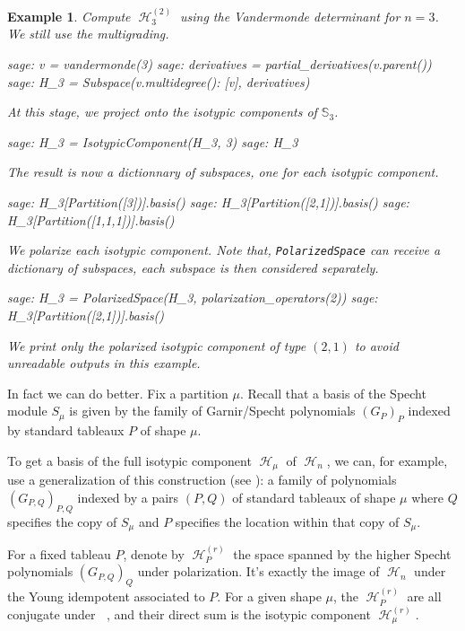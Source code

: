 \documentclass[letter,12pt]{article}
\newcommand{\pauline}[1]{\todo[linecolor=blue,backgroundcolor=cyan!25,bordercolor=blue]{#1}}
\newcommand{\Sym}[1]{\mathbb{S}_{#1}}
\newcommand{\Elambda}[1]{\mathcal{E}_{#1}}
\DeclareMathOperator{\Sn}{\mathbb{S}_n}
\DeclareMathOperator{\harmonics}{\mathcal{H}}
\newtheorem{example}{Example}
\begin{document}
	\begin{example} \label{multigrading}
		Compute $\harmonics_3^{(2)}$ using the Vandermonde determinant for $n=3$. We still use the multigrading. 
		\begin{sagecommandline}
			sage: v = vandermonde(3)
			sage: derivatives = partial_derivatives(v.parent())
			sage: H_3 = Subspace({v.multidegree(): [v]}, derivatives)
		\end{sagecommandline}
		At this stage, we project onto the isotypic components of $\Sym{3}$.
		\begin{sagecommandline}
			sage: H_3 = IsotypicComponent(H_3, 3)
			sage: H_3
		\end{sagecommandline}
		The result is now a dictionnary of subspaces, one for each isotypic component.
		\begin{sagecommandline}
			sage: H_3[Partition([3])].basis()
			sage: H_3[Partition([2,1])].basis()
			sage: H_3[Partition([1,1,1])].basis()
		\end{sagecommandline}
		We polarize each isotypic component. Note that, \texttt{PolarizedSpace} can receive a dictionary of subspaces, each subspace is then considered separately. 
		\begin{sagecommandline}
			sage: H_3 = PolarizedSpace(H_3, polarization_operators(2))
			sage: H_3[Partition([2,1])].basis()
		\end{sagecommandline}
	We print only the polarized isotypic component of type $(2,1)$ to avoid unreadable outputs in this example. 	
	\end{example}
		
	In fact we can do better. \pauline{Does it work only for $\harmonics_n^{(r)}$ or also for $\Elambda{\lambda}$?}
	Fix a partition $\mu$. Recall that a basis of the Specht module $S_\mu$  is given by the family of Garnir/Specht polynomials $(G_{P})_P$ indexed by standard tableaux $P$ of shape $\mu$.
	
	To get a basis of the full isotypic component $\harmonics_{\mu}$ of $\harmonics_n$, we can, for example, use a generalization of this construction (see \cite{Ariki1997}): a family of polynomials $(G_{P,Q})_{P,Q}$ indexed by a pairs $(P,Q)$ of standard tableaux of shape $\mu$ where $Q$ specifies the copy of $S_\mu$ and $P$ specifies the location within that copy of $S_\mu$.
	
	
	For a fixed tableau $P$, denote by $\harmonics_P^{(r)}$ the space spanned by the higher Specht polynomials $(G_{P,Q})_Q$ under polarization. It's exactly the image of $\harmonics_n$ under the Young idempotent associated to $P$. For a given shape $\mu$, the $\harmonics_P^{(r)}$ are all conjugate under $\Sn$, and their direct sum is the isotypic component $\harmonics_{\mu}^{(r)}$.
	
\end{document}
